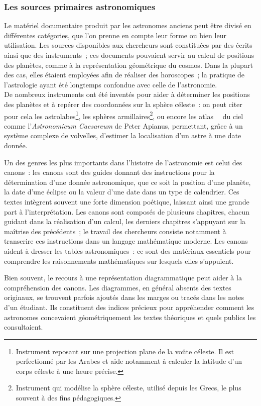 \documentclass[a4paper,12pt,twoside]{book}
\newcommand{\g}[1]{\og#1~\fg}
\begin{document}
			\subsubsection{Les sources primaires astronomiques}
Le matériel documentaire produit par les astronomes anciens peut être divisé en différentes catégories, que l'on prenne en compte leur forme ou bien leur utilisation. Les sources disponibles aux chercheurs sont constituées par des écrits ainsi que des instruments~; ces documents pouvaient servir au calcul de positions des planètes, comme à la représentation géométrique du cosmos. Dans la plupart des cas, elles étaient employées afin de réaliser des horoscopes~; la pratique de l'astrologie ayant été longtemps confondue avec celle de l'astronomie.\\

De nombreux instruments ont été inventés pour aider à déterminer les positions des planètes et à repérer des coordonnées sur la sphère céleste~: on peut citer pour cela les astrolabes\footnote{Instrument reposant sur une projection plane de la voûte céleste. Il est perfectionné par les Arabes et aide notamment à calculer la latitude d'un corps céleste à une heure précise.}, les sphères armillaires\footnote{Instrument qui modélise la sphère céleste, utilisé depuis les Grecs, le plus souvent à des fins pédagogiques.}, ou encore les \g{atlas}~ du ciel comme l'\emph{Astronomicum Caesareum} de Peter Apianus, permettant, grâce à un système complexe de volvelles, d'estimer la localisation d'un astre à une date donnée.

Un des genres les plus importants dans l'histoire de l'astronomie est celui des canons~: les canons sont des guides donnant des instructions pour la détermination d'une donnée astronomique, que ce soit la position d'une planète, la date d'une éclipse ou la valeur d'une date dans un type de calendrier. Ces textes intègrent souvent une forte dimension poétique, laissant ainsi une grande part à l'interprétation. Les canons sont composés de plusieurs chapitres, chacun guidant dans la réalisation d'un calcul, les derniers chapitres s'appuyant sur la maîtrise des précédents~; le travail des chercheurs consiste notamment à transcrire ces instructions dans un langage mathématique moderne. Les canons aident à dresser les tables astronomiques~: ce sont des matériaux essentiels pour comprendre les raisonnements mathématiques sur lesquels elles s'appuient.

Bien souvent, le recours à une représentation diagrammatique peut aider à la compréhension des canons. Les diagrammes, en général absents des textes originaux, se trouvent parfois ajoutés dans les marges ou tracés dans les notes d'un étudiant. Ils constituent des indices précieux pour appréhender comment les astronomes concevaient géométriquement les textes théoriques et quels publics les consultaient.
\end{document}
